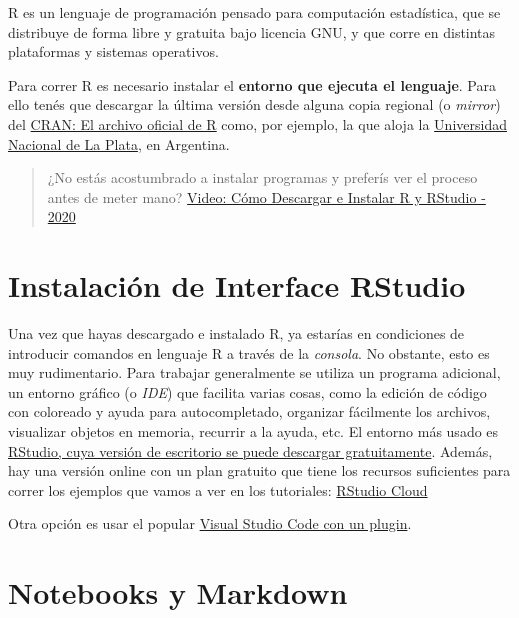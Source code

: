 \documentclass[
]{book}
\begin{document}
R es un lenguaje de programación pensado para computación estadística, que se distribuye de forma libre y gratuita bajo licencia GNU, y que corre en distintas plataformas y sistemas operativos.

Para correr R es necesario instalar el \textbf{entorno que ejecuta el lenguaje}.
Para ello tenés que descargar la última versión desde alguna copia regional (o \emph{mirror}) del \href{https://cran.r-project.org/mirrors.html}{CRAN: El archivo oficial de R} como, por ejemplo, la que aloja la \href{http://mirror.fcaglp.unlp.edu.ar/CRAN/}{Universidad Nacional de La Plata}, en Argentina.

\begin{quote}
¿No estás acostumbrado a instalar programas y preferís ver el proceso antes de meter mano? \href{https://www.youtube.com/watch?v=D9Bp11iZssc}{Video: Cómo Descargar e Instalar R y RStudio - 2020}
\end{quote}

\hypertarget{instalaciuxf3n-de-interface-rstudio}{%
\section*{Instalación de Interface RStudio}\label{instalaciuxf3n-de-interface-rstudio}}

Una vez que hayas descargado e instalado R, ya estarías en condiciones de introducir comandos en lenguaje R a través de la \emph{consola}. No obstante, esto es muy rudimentario.
Para trabajar generalmente se utiliza un programa adicional, un entorno gráfico (o \emph{IDE}) que facilita varias cosas, como la edición de código con coloreado y ayuda para autocompletado, organizar fácilmente los archivos, visualizar objetos en memoria, recurrir a la ayuda, etc.
El entorno más usado es \href{https://rstudio.com/products/rstudio/download/\#download}{RStudio, cuya versión de escritorio se puede descargar gratuitamente}.
Además, hay una versión online con un plan gratuito que tiene los recursos suficientes para correr los ejemplos que vamos a ver en los tutoriales: \href{https://rstudio.cloud/plans/free}{RStudio Cloud}

Otra opción es usar el popular \href{https://marketplace.visualstudio.com/items?itemName=Ikuyadeu.r}{Visual Studio Code con un plugin}.

\hypertarget{notebooks-y-markdown}{%
\section*{Notebooks y Markdown}\label{notebooks-y-markdown}}
\end{document}
